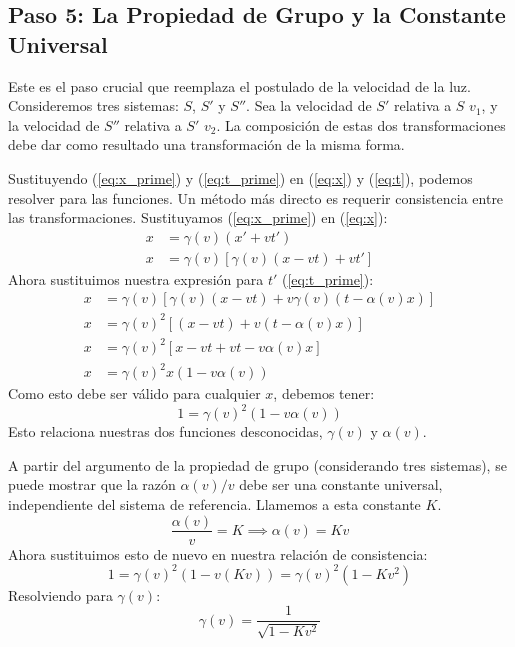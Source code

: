 \documentclass[11pt,a4paper]{article}
\begin{document}
\subsection{Paso 5: La Propiedad de Grupo y la Constante Universal}
Este es el paso crucial que reemplaza el postulado de la velocidad de la luz. Consideremos tres sistemas: $S$, $S'$ y $S''$. Sea la velocidad de $S'$ relativa a $S$ $v_1$, y la velocidad de $S''$ relativa a $S'$ $v_2$. La composición de estas dos transformaciones debe dar como resultado una transformación de la misma forma.

Sustituyendo (\ref{eq:x_prime}) y (\ref{eq:t_prime}) en (\ref{eq:x}) y (\ref{eq:t}), podemos resolver para las funciones. Un método más directo es requerir consistencia entre las transformaciones. Sustituyamos (\ref{eq:x_prime}) en (\ref{eq:x}):
\begin{align*}
x &= \gamma(v)(x' + vt') \\
x &= \gamma(v)[\gamma(v)(x-vt) + v t']
\end{align*}
Ahora sustituimos nuestra expresión para $t'$ (\ref{eq:t_prime}):
\begin{align*}
x &= \gamma(v)[\gamma(v)(x-vt) + v \gamma(v)(t - \alpha(v)x)] \\
x &= \gamma(v)^2 [ (x-vt) + v(t-\alpha(v)x) ] \\
x &= \gamma(v)^2 [ x - vt + vt - v\alpha(v)x ] \\
x &= \gamma(v)^2 x (1 - v\alpha(v))
\end{align*}
Como esto debe ser válido para cualquier $x$, debemos tener:
\[ 1 = \gamma(v)^2 (1 - v\alpha(v)) \]
Esto relaciona nuestras dos funciones desconocidas, $\gamma(v)$ y $\alpha(v)$.

A partir del argumento de la propiedad de grupo (considerando tres sistemas), se puede mostrar que la razón $\alpha(v)/v$ debe ser una constante universal, independiente del sistema de referencia. Llamemos a esta constante $K$.
\[ \frac{\alpha(v)}{v} = K \implies \alpha(v) = Kv \]
Ahora sustituimos esto de nuevo en nuestra relación de consistencia:
\[ 1 = \gamma(v)^2 (1 - v(Kv)) = \gamma(v)^2 (1 - K v^2) \]
Resolviendo para $\gamma(v)$:
\[ \boxed{\gamma(v) = \frac{1}{\sqrt{1 - K v^2}}} \]
\end{document}
